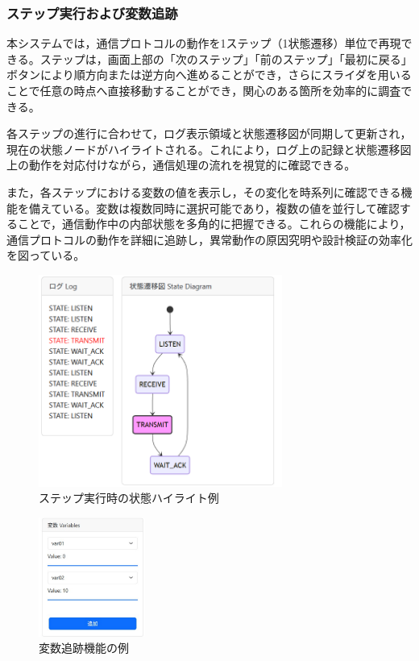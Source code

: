 \documentclass[technicalreport]{ieicej}
\begin{document}
\subsubsection{ステップ実行および変数追跡}
本システムでは，通信プロトコルの動作を1ステップ（1状態遷移）単位で再現できる。ステップは，画面上部の「次のステップ」「前のステップ」「最初に戻る」ボタンにより順方向または逆方向へ進めることができ，さらにスライダを用いることで任意の時点へ直接移動することができ，関心のある箇所を効率的に調査できる。

各ステップの進行に合わせて，ログ表示領域と状態遷移図が同期して更新され，現在の状態ノードがハイライトされる。これにより，ログ上の記録と状態遷移図上の動作を対応付けながら，通信処理の流れを視覚的に確認できる。

また，各ステップにおける変数の値を表示し，その変化を時系列に確認できる機能を備えている。変数は複数同時に選択可能であり，複数の値を並行して確認することで，通信動作中の内部状態を多角的に把握できる。これらの機能により，通信プロトコルの動作を詳細に追跡し，異常動作の原因究明や設計検証の効率化を図っている。

\begin{figure}[h]
\centering
\includegraphics[width=80mm]{./images/step_22.png}
\caption{ステップ実行時の状態ハイライト例}
\label{fig:viewer-ui-step}
\end{figure}

\begin{figure}[h]
\centering
\includegraphics[width=35mm]{./images/var_log2.jpg}
\caption{変数追跡機能の例}
\label{fig:var-tracking}
\end{figure}
\end{document}
